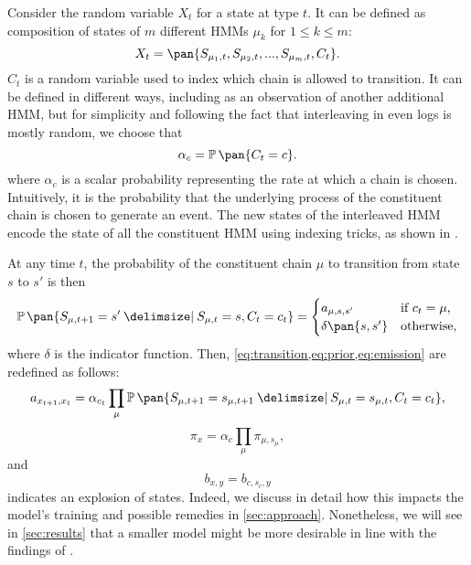 Consider the random variable \(X_t\) for a state at type \(t\). It can be defined as composition of states of \(m\) different HMMs \(\mu_k\) for \(1 \leq k \leq m\):
\begin{equation}\label{eq:state_encoding}
    X_t = \pan{S_{\mu_1,t}, S_{\mu_2,t}, ..., S_{\mu_m,t}, C_t}.
\end{equation}
\(C_t\) is a random variable used to index which chain is allowed to transition. It can be defined in different ways, including as an observation of another additional HMM, but for simplicity and following the fact that interleaving in even logs is mostly random, we choose that
\begin{equation}
    \alpha_c = \prob\pan{C_t = c}.
\end{equation}
where \(\alpha_c\) is a scalar probability representing the rate at which a chain is chosen. Intuitively, it is the probability that the underlying process of the constituent chain is chosen to generate an event. The new states of the interleaved HMM encode the state of all the constituent HMM using indexing tricks, as shown in \cite{Minot2014-gn}.

At any time \(t\), the probability of the constituent chain \(\mu\) to transition from state \(s\) to \(s'\) is then
\begin{equation}
    \prob\pan{S_{\mu,t+1} = s' \giv S_{\mu,t} = s, C_t = c_t} = \begin{cases}
        a_{\mu,s,s'} & \text{if $c_t = \mu$,} \\
        \delta\pan{s, s'} & \text{otherwise,} \\
    \end{cases}
\end{equation}
where \(\delta\) is the indicator function.
Then, \cref{eq:transition,eq:prior,eq:emission} are redefined as follows:
\begin{equation}\label{eq:interleaved_transition}
    \begin{multlined}
        a_{x_{t+1}, x_t} =
        \alpha_{c_t}\prod_{\mu} \prob\pan{S_{\mu,t+1} = s_{\mu,t+1} \giv S_{\mu,t} = s_{\mu,t}, C_t = c_t},
    \end{multlined}
\end{equation}
\begin{equation}
    \pi_x = \alpha_c \prod_\mu \pi_{\mu,s_\mu},
\end{equation}
and
\begin{equation}
    b_{x,y} = b_{c,s_c,y}
\end{equation}
 indicates an explosion of states. Indeed, we discuss in detail how this impacts the model's training and possible remedies in \cref{sec:approach}. Nonetheless, we will see in \cref{sec:results} that a smaller model might be more desirable in line with the findings of \cite{Cohen2005-mn}.

